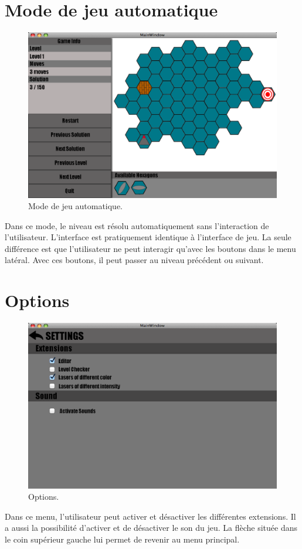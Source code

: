 \documentclass[]{article}
\begin{document}
\section{Mode de jeu automatique}\label{sec:auto}
\begin{figure}[!htb]
\begin{center}
  \includegraphics[width=\textwidth]{Auto.png}
  \caption{Mode de jeu automatique.}\label{fig:auto}
\end{center}
\end{figure}

Dans ce mode, le niveau est résolu automatiquement sans l'interaction de l'utilisateur.
L'interface est pratiquement identique à l'interface de jeu. La seule différence est que l'utilisateur ne peut interagir qu'avec les boutons dans le menu latéral. Avec ces boutons, il peut passer au niveau précédent ou suivant. 
\newpage
\section{Options}\label{sec:options}

\begin{figure}[!htb]
\begin{center}
  \includegraphics[width=\textwidth]{Options.png}
  \caption{Options.}\label{fig:options}
\end{center}
\end{figure}

Dans ce menu, l'utilisateur peut activer et désactiver les différentes extensions. Il a aussi la possibilité d'activer et de désactiver le son du jeu. La flèche située dans le coin supérieur gauche lui permet de revenir au menu principal.
\end{document}
